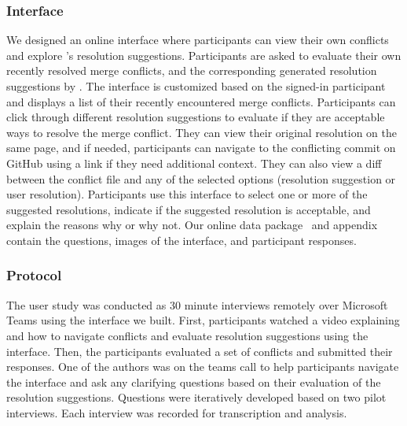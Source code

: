 \subsubsection{\thistool{} Interface}
We designed an online interface where participants can view their own conflicts and explore \thistool{}'s resolution suggestions. Participants are asked to evaluate their own recently resolved merge conflicts, and the corresponding generated resolution suggestions by \thistool{}. The interface is customized based on the signed-in participant and displays a list of their recently encountered merge conflicts. Participants can click through different resolution suggestions to evaluate if they are acceptable ways to resolve the merge conflict. They can view their original resolution on the same page, and if needed, participants can navigate to the conflicting commit on GitHub using a link if they need additional context. They can also view a diff between the conflict file and any of the selected options (resolution suggestion or user resolution). Participants use this interface to select one or more of the suggested resolutions, indicate if the suggested resolution is acceptable, and explain the reasons why or why not.  Our online data package~\cite{ICSE22Replication} and appendix~\cite{FSE22Appendix} contain the questions, images of the interface, and participant responses.  



\subsubsection{Protocol}
The user study was conducted as 30 minute interviews remotely over Microsoft Teams using the interface we built. First, participants watched a video explaining \thistool{} and how to navigate conflicts and evaluate resolution suggestions using the interface. Then, the participants evaluated a set of conflicts and submitted their responses. One of the authors was on the teams call to help participants navigate the interface and ask any clarifying questions based on their evaluation of the \thistool{} resolution suggestions.
Questions were iteratively developed based on two pilot interviews. Each interview was recorded for transcription and analysis. 

